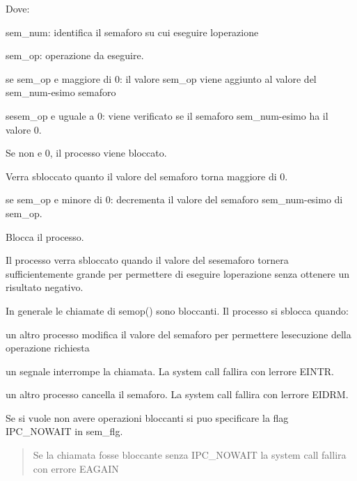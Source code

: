 Dove\+:
\begin{DoxyItemize}
\item {\ttfamily sem\+\_\+num}\+: identifica il semaforo su cui eseguire l\textquotesingle{}operazione
\item {\ttfamily sem\+\_\+op}\+: operazione da eseguire.
\begin{DoxyItemize}
\item se {\ttfamily sem\+\_\+op} e\textquotesingle{} maggiore di 0\+: il valore {\ttfamily sem\+\_\+op} viene aggiunto al valore del {\ttfamily sem\+\_\+num}-\/esimo semaforo
\item se{\ttfamily sem\+\_\+op} e\textquotesingle{} uguale a 0\+: viene verificato se il semaforo {\ttfamily sem\+\_\+num}-\/esimo ha il valore 0.

Se non e\textquotesingle{} 0, il processo viene bloccato.

Verra\textquotesingle{} sbloccato quanto il valore del semaforo torna maggiore di 0.
\item se {\ttfamily sem\+\_\+op} e\textquotesingle{} minore di 0\+: decrementa il valore del semaforo {\ttfamily sem\+\_\+num}-\/esimo di {\ttfamily sem\+\_\+op}.

Blocca il processo.

Il processo verra\textquotesingle{} sbloccato quando il valore del sesemaforo tornera\textquotesingle{} sufficientemente grande per permettere di eseguire l\textquotesingle{}operazione senza ottenere un risultato negativo.
\end{DoxyItemize}
\end{DoxyItemize}

In generale le chiamate di {\ttfamily semop()} sono bloccanti. Il processo si sblocca quando\+:
\begin{DoxyItemize}
\item un altro processo modifica il valore del semaforo per permettere l\textquotesingle{}esecuzione della operazione richiesta
\item un segnale interrompe la chiamata. La system call fallira\textquotesingle{} con l\textquotesingle{}errore E\+I\+N\+TR.
\item un altro processo cancella il semaforo. La system call fallira\textquotesingle{} con l\textquotesingle{}errore E\+I\+D\+RM.
\end{DoxyItemize}

Se si vuole non avere operazioni bloccanti si puo\textquotesingle{} specificare la flag {\ttfamily I\+P\+C\+\_\+\+N\+O\+W\+A\+IT} in {\ttfamily sem\+\_\+flg}. \begin{quote}
Se la chiamata fosse bloccante senza {\ttfamily I\+P\+C\+\_\+\+N\+O\+W\+A\+IT} la system call fallira\textquotesingle{} con errore {\ttfamily E\+A\+G\+A\+IN} \end{quote}


